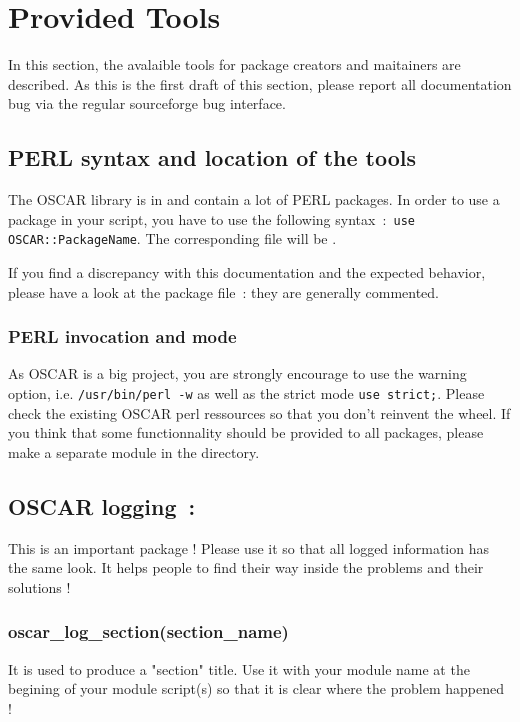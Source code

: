 \section{Provided Tools}

In this section, the avalaible tools for package creators and maitainers
are described.  As this is the first draft of this section, 
please report all documentation bug via the regular sourceforge bug interface.

\subsection{PERL syntax and location of the tools}

The OSCAR library is in  and contain a lot of PERL packages.
In order to use a package in your script, you have to use the following
syntax~:\verb+ use OSCAR::PackageName+. The corresponding file will be
.

If you find a discrepancy with this documentation and the expected behavior,
please have a look at the package file~: they are generally commented.

\subsubsection{PERL invocation and mode}

As OSCAR is a big project, you are strongly encourage to use the warning
option, i.e.  \verb+/usr/bin/perl -w+ as well as the strict mode 
\verb+use strict;+. Please check the existing OSCAR perl ressources so that you don't
reinvent the wheel. If you think that some functionnality should be provided
to all packages, please make a separate module in the 
directory.

\subsection{OSCAR logging~: }

This is an important package ! Please use it so that all logged information
has the same look. It helps people to find their way inside the problems and
their solutions !

\subsubsection{oscar\_log\_section(section\_name)}

It is used to produce a "section" title. Use it with your module name at the
begining of your module script(s) so that it is clear where the problem
happened !

